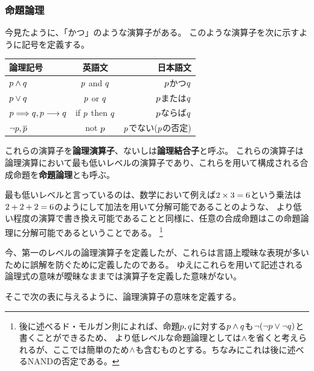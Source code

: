 \documentclass[a4j, 9pt]{ltjsarticle}
\begin{document}
    \subsubsection{命題論理}
      今見たように、「かつ」のような演算子がある。
      このような演算子を次に示すように記号を定義する。\par

      \begin{center}
        \begin{table}[hbtp]
          \centering
          \begin{tabular}{lcr}
            \hline
            論理記号  & 英語文  &  日本語文  \\
            \hline \hline
              $\displaystyle p \land q$                                 & $\displaystyle p$ and $\displaystyle q$     & $\displaystyle p$かつ$\displaystyle q$\\
              $\displaystyle p \lor q$                                  & $\displaystyle p$ or  $\displaystyle q$     & $\displaystyle p$または$\displaystyle q$\\
              $\displaystyle p \Longrightarrow q, p \longrightarrow q$  & if $\displaystyle p$ then $\displaystyle q$ & $\displaystyle p$ならば$\displaystyle q$\\
              $\displaystyle \lnot p, \overline{p}$                     & not $\displaystyle p$             & $\displaystyle p$でない($\displaystyle p$の否定)\\
          \end{tabular}
        \end{table}
      \end{center}

      これらの演算子を\textbf{論理演算子}、ないしは\textbf{論理結合子}と呼ぶ。
      これらの演算子は論理演算において最も低いレベルの演算子であり、これらを用いて構成される合成命題を\textbf{命題論理}とも呼ぶ。\par
      最も低いレベルと言っているのは、数学において例えば$\displaystyle 2 \times 3 = 6$という乗法は$\displaystyle 2 + 2 + 2 = 6$のようにして加法を用いて分解可能であることのような、
      より低い程度の演算で書き換え可能であることと同様に、任意の合成命題はこの命題論理に分解可能であるということである。
      \footnote{
        後に述べるド・モルガン則によれば、命題$\displaystyle p, q$に対する$\displaystyle p \land q$も$\displaystyle \lnot(\lnot{p} \lor \lnot{q})$と書くことができるため、
        より低レベルな命題論理としては$\displaystyle \land$を省くと考えられるが、ここでは簡単のため$\displaystyle \land$も含むものとする。ちなみにこれは後に述べるNANDの否定である。
      }
      \par

      今、第一のレベルの論理演算子を定義したが、これらは言語上曖昧な表現が多いために誤解を防ぐために定義したのである。
      ゆえにこれらを用いて記述される論理式の意味が曖昧なままでは演算子を定義した意味がない。\par
      そこで次の表に与えるように、論理演算子の意味を定義する。
\end{document}
